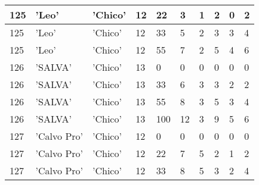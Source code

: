 \begin{table}[H]
\begin{center}
\begin{tabular}{ @{} | m{2em} | m{4em} | m{3em} | m{2em} | m{4em} | m{4em} | m{4em} | m{3em} | m{3em} | m{4em} |  }
  \hline
  125  & 'Leo' & 'Chico' &12 &22 &3 &1 &2 &0 &2  \\
  \hline
  125  & 'Leo' & 'Chico' &12 &33 &5 &2 &3 &3 &4  \\
  \hline
  125  & 'Leo' & 'Chico' &12 &55 &7 &2 &5 &4 &6  \\
  \hline
  126  & 'SALVA' & 'Chico' &13 &0 &0 &0 &0 &0 &0  \\
  \hline
  126  & 'SALVA' & 'Chico' &13 &33 &6 &3 &3 &2 &2  \\
  \hline
  126  & 'SALVA' & 'Chico' &13 &55 &8 &3 &5 &3 &4  \\
  \hline
  126  & 'SALVA' & 'Chico' &13 &100 &12 &3 &9 &5 &6  \\
  \hline
  127  & 'Calvo Pro' & 'Chico' &12 &0 &0 &0 &0 &0 &0 \\
  \hline
  127  & 'Calvo Pro' & 'Chico' &12 &22 &7 &5 &2 &1 &2 \\
  \hline 
  127  & 'Calvo Pro' & 'Chico' &12 &33 &8 &5 &3 &2 &4 \\
  \hline 
\end{tabular}
\centering
\end{center}
\end{table} 

